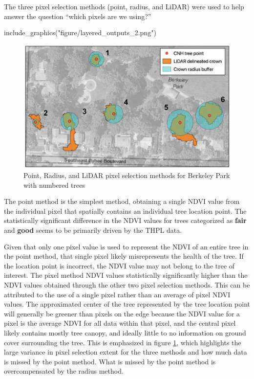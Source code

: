 \documentclass[12pt,twoside]{reedthesis}
\newenvironment{Shaded}{\begin{snugshade}}{\end{snugshade}}
\newcommand{\FunctionTok}[1]{\textcolor[rgb]{0.00,0.00,0.00}{#1}}
\newcommand{\NormalTok}[1]{#1}
\newcommand{\StringTok}[1]{\textcolor[rgb]{0.31,0.60,0.02}{#1}}
\begin{document}
The three pixel selection methods (point, radius, and LiDAR) were used
to help answer the question ``which pixels are we using?''
\begin{Shaded}
\begin{Highlighting}[]
\FunctionTok{include\_graphics}\NormalTok{(}\StringTok{"figure/layered\_outputs\_2.png"}\NormalTok{)}
\end{Highlighting}
\end{Shaded}
\begin{figure}

{\centering \includegraphics[width=0.9\linewidth]{figure/layered_outputs_2} 

}

\caption[Pixel selection method comparison with numbered trees]{Point, Radius, and LiDAR pixel selection methods for Berkeley Park with numbered trees}\label{fig:layered-outputs-2}
\end{figure}
The point method is the simplest method, obtaining a single NDVI value
from the individual pixel that spatially contains an individual tree
location point. The statistically significant difference in the NDVI
values for trees categorized as \textbf{fair} and \textbf{good} seems to be
primarily driven by the THPL data.

Given that only one pixel value is used to represent the NDVI of an
entire tree in the point method, that single pixel likely misrepresents
the health of the tree. If the location point is incorrect, the NDVI
value may not belong to the tree of interest. The pixel method NDVI
values statistically significantly higher than the NDVI values obtained
through the other two pixel selection methods. This can be attributed to
the use of a single pixel rather than an average of pixel NDVI values.
The approximated center of the tree represented by the tree location
point will generally be greener than pixels on the edge because the NDVI
value for a pixel is the average NDVI for all data within that pixel,
and the central pixel likely contains mostly tree canopy, and ideally
little to no information on ground cover surrounding the tree. This is
emphasized in figure \ref{fig:layered-outputs-2}, which highlights the
large variance in pixel selection extent for the three methods and how
much data is missed by the point method. What is missed by the point
method is overcompensated by the radius method.
\end{document}
